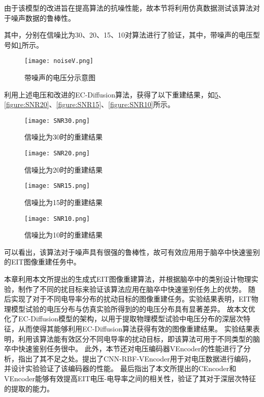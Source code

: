 由于该模型的改进旨在提高算法的抗噪性能，故本节将利用仿真数据测试该算法对于噪声数据的鲁棒性。

其中，分别在信噪比为30、20、15、10对算法进行了验证，其中，带噪声的电压型号如\cref{figure:noiseV}所示。

\begin{figure}[H]
    \centering
    \texttt{[image: noiseV.png]}
    \caption{带噪声的电压分示意图}
    \label{figure:noiseV}
\end{figure}

利用上述电压和改进的EC-Diffusion算法，获得了以下重建结果，如\cref{figure:SNR30}、\cref{figure:SNR20}、\cref{figure:SNR15}、\cref{figure:SNR10}所示。

\begin{figure}[H]
    \centering
    \texttt{[image: SNR30.png]}
    \caption{信噪比为30时的重建结果}
    \label{figure:SNR30}
\end{figure}

\begin{figure}[H]
    \centering
    \texttt{[image: SNR20.png]}
    \caption{信噪比为20时的重建结果}
    \label{figure:SNR30}
\end{figure}

\begin{figure}[H]
    \centering
    \texttt{[image: SNR15.png]}
    \caption{信噪比为15时的重建结果}
    \label{figure:SNR30}
\end{figure}

\begin{figure}[H]
    \centering
    \texttt{[image: SNR10.png]}
    \caption{信噪比为10时的重建结果}
    \label{figure:SNR30}
\end{figure}

可以看出，该算法对于噪声具有很强的鲁棒性，故可有效应用用于脑卒中快速鉴别的EIT图像重建任务中。


本章利用本文所提出的生成式EIT图像重建算法，并根据脑卒中的类别设计物理实验，制作了不同的扰目标来验证该算法应用在脑卒中快速鉴别任务上的优势。
随后实现了对于不同电导率分布的扰动目标的图像重建任务。实验结果表明，EIT物理模型试验的电压分布与仿真实验所得到的的电压分布具有显著差异。
故本文优化了EC-Diffusion模型的架构，以用于提取物理模型试验中电压分布的深层次特征，从而使得其能够利用EC-Diffusion算法获得有效的图像重建结果。
实验结果表明，利用该算法能有效区分不同电导率的扰动目标，即该算法可用于不同类型的脑卒中快速鉴别任务很中。
此外，本节还对电压编码器VEncoder的性能进行了分析，指出了其不足之处。提出了CNN-RBF-VEncoder用于对电压数据进行编码，并设计实验验证了该编码器的性能。
最后指出了本文所提出的CEncoder和VEncoder能够有效提高EIT电压-电导率之间的相关性，验证了其对于深层次特征的提取的能力。

